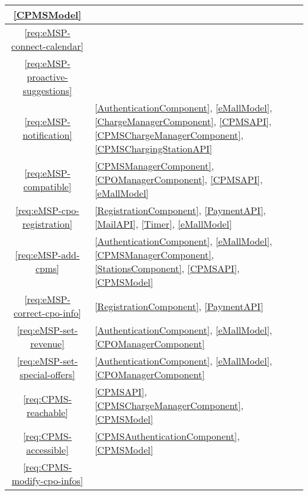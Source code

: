\begin{table}[h]
\begin{center}
\begin{tabular}{|c||p{15.5cm}|}
            \ref{CPMSModel}
            \\
            \hline
            \ref{req:eMSP-connect-calendar} & 
            \\
            \hline
            \ref{req:eMSP-proactive-suggestions} & 
            \\
            \hline
            \ref{req:eMSP-notification} &
            \ref{AuthenticationComponent},
            \ref{eMallModel},
            \ref{ChargeManagerComponent},
            \ref{CPMSAPI},
            \ref{CPMSChargeManagerComponent},
            \ref{CPMSChargingStationAPI}
            \\
            \hline
            \ref{req:eMSP-compatible} &
            \ref{CPMSManagerComponent},
            \ref{CPOManagerComponent},
            \ref{CPMSAPI},
            \ref{eMallModel}
            \\
            \hline
            \ref{req:eMSP-cpo-registration} &
            \ref{RegistrationComponent},
            \ref{PaymentAPI},
            \ref{MailAPI},
            \ref{Timer},
            \ref{eMallModel}
            \\
            \hline
            \ref{req:eMSP-add-cpms} &
            \ref{AuthenticationComponent},
            \ref{eMallModel},
            \ref{CPMSManagerComponent},
            \ref{StationsComponent},
            \ref{CPMSAPI},
            \ref{CPMSModel}
            \\
            \hline
            \ref{req:eMSP-correct-cpo-info} &
            \ref{RegistrationComponent},
            \ref{PaymentAPI}
            \\
            \hline
            \ref{req:eMSP-set-revenue} &
            \ref{AuthenticationComponent},
            \ref{eMallModel},
            \ref{CPOManagerComponent}
            \\
            \hline
            \ref{req:eMSP-set-special-offers} &
            \ref{AuthenticationComponent},
            \ref{eMallModel},
            \ref{CPOManagerComponent}
            \\
            \hline
            \ref{req:CPMS-reachable} &
            \ref{CPMSAPI},
            \ref{CPMSChargeManagerComponent},
            \ref{CPMSModel}
            \\
            \hline
            \ref{req:CPMS-accessible} &
            \ref{CPMSAuthenticationComponent},
            \ref{CPMSModel}
            \\
            \hline
            \ref{req:CPMS-modify-cpo-infos} &

\end{tabular}
\end{center}
\end{table}
